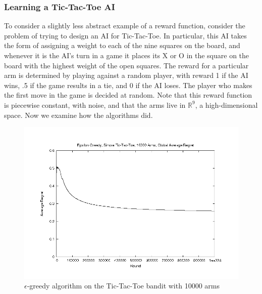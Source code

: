 \subsubsection{Learning a Tic-Tac-Toe AI}
To consider a slightly less abstract example of a reward function, 
consider the problem of trying to design an AI for Tic-Tac-Toe.  In
particular, this AI takes the form of assigning a weight to each of the
nine squares on the board, and whenever it is the AI's turn in a game it
places its X or O in the square on the board with the highest weight of
the open squares.  The reward for a particular arm is determined by
playing against a random player, with reward 1 if the AI wins, .5 if the
game results in a tie, and 0 if the AI loses.  The player who makes the
first move in the game is decided at random.  Note that this reward 
function is piecewise constant, with noise, and that the arms live in
$\mathbb{R}^9$, a high-dimensional space.  Now we examine how the
algorithms did.

\begin{figure}[!ht]
  \begin{center}
    \includegraphics[width=\figwidth]{data/tictactoe/egtoe10000_GA.png}
     \caption{$\epsilon$-greedy algorithm on the Tic-Tac-Toe bandit with
     10000 arms}
     \label{fig:egtoe}
  \end{center}
\end{figure}

